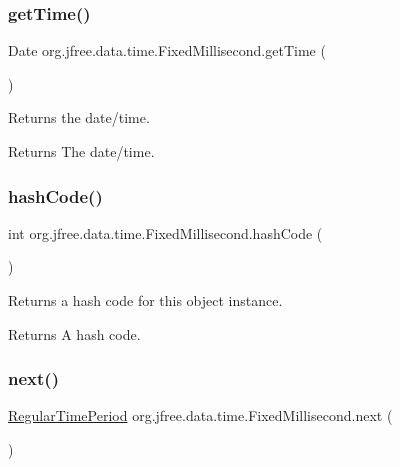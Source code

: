 \subsubsection{\texorpdfstring{get\+Time()}{getTime()}}
{\footnotesize\ttfamily Date org.\+jfree.\+data.\+time.\+Fixed\+Millisecond.\+get\+Time (\begin{DoxyParamCaption}{ }\end{DoxyParamCaption})}

Returns the date/time.

\begin{DoxyReturn}{Returns}
The date/time. 
\end{DoxyReturn}
\mbox{\label{classorg_1_1jfree_1_1data_1_1time_1_1_fixed_millisecond_a3e46c88e31481a4a781e7f9529a85d11}} 
\subsubsection{\texorpdfstring{hash\+Code()}{hashCode()}}
{\footnotesize\ttfamily int org.\+jfree.\+data.\+time.\+Fixed\+Millisecond.\+hash\+Code (\begin{DoxyParamCaption}{ }\end{DoxyParamCaption})}

Returns a hash code for this object instance.

\begin{DoxyReturn}{Returns}
A hash code. 
\end{DoxyReturn}
\mbox{\label{classorg_1_1jfree_1_1data_1_1time_1_1_fixed_millisecond_aec64e9f66703fd7b99571bec02c58ea9}} 
\subsubsection{\texorpdfstring{next()}{next()}}
{\footnotesize\ttfamily \mbox{\hyperlink{classorg_1_1jfree_1_1data_1_1time_1_1_regular_time_period}{Regular\+Time\+Period}} org.\+jfree.\+data.\+time.\+Fixed\+Millisecond.\+next (\begin{DoxyParamCaption}{ }\end{DoxyParamCaption})}

